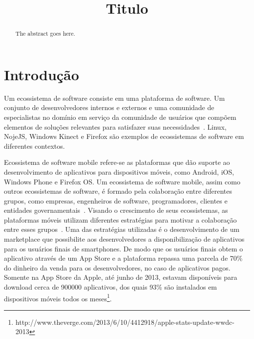 \documentclass[conference]{IEEEtran}
\begin{document}
\title{Titulo}

\author{
}

\maketitle


\begin{abstract}
The abstract goes here.
\end{abstract}

\IEEEpeerreviewmaketitle



\section{Introdução}

Um ecossistema de software consiste em uma plataforma de software. Um conjunto de desenvolvedores internos e externos e uma comunidade de especialistas no domínio em serviço da comunidade de usuários que compõem elementos de soluções relevantes para satisfazer suas necessidades~\cite{Bosch201067}. Linux, NojeJS, Windows Kinect e Firefox são exemplos de ecossistemas de software em diferentes contextos. 

Ecossistema de software mobile refere-se as plataformas que dão suporte ao desenvolvimento de aplicativos para dispositivos móveis, como Android, iOS, Windows Phone e Firefox OS. Um ecossistema de software mobile, assim como outros ecossistemas de software, é formado pela colaboração entre diferentes grupos, como empresas, engenheiros de software, programadores, clientes e entidades governamentais~\cite{Jansen2013,Scacchi2012}. Visando o crescimento de seus ecossistemas, as plataformas móveis utilizam diferentes estratégias para motivar a colaboração entre esses grupos~\cite{Corral2014}. Uma das estratégias utilizadas é o desenvolvimento de um marketplace que possibilite aos desenvolvedores a disponibilização de aplicativos para os usuários finais de smartphones. De modo que os usuários finais obtem o aplicativo através de um App Store e a plataforma repassa uma parcela de 70\% do dinheiro da venda para os desenvolvedores, no caso de aplicativos pagos. Somente na App Store da Apple, até junho de 2013, estavam disponíveis para download cerca de 900000 aplicativos, dos quais 93\% são instalados em dispositivos móveis todos os meses\footnote{http://www.theverge.com/2013/6/10/4412918/apple-stats-update-wwdc-2013}. 
  
\end{document}

